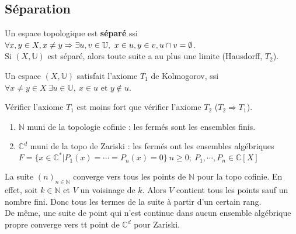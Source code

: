 \subsection{Séparation}
\begin{definition}
    Un espace topologique est \textbf{séparé} ssi $\forall x,y\in X,\\ x\neq y\Rightarrow \exists u,v\in \mathbb{U},\ x\in u, y\in v, u\cap v=\emptyset $.\\
Si $(X,\mathbb{U})$ est séparé, alors toute suite a au plus une limite (Hausdorff, $T_2$).\\

\end{definition}
\begin{definition}
        Un espace $(X,\mathbb{U})$ satisfait l'axiome $T_1$ de Kolmogorov, ssi $\forall x\neq y\in X\ \exists u\in \mathbb{U},\ x\in u \text{ et } y \not \in u$.\\

\end{definition}
\begin{ex}

Vérifier l'axiome $T_1$ est moins fort que vérifier l'axiome $T_2$ ($T_2 \Rightarrow T_1$). 
 
\begin{enumerate}

   \item $\mathbb{N} $ muni de la topologie cofinie : les fermés sont les ensembles finis.
\item $\mathbb{C}^d$ muni de la topo de Zariski : les fermés ont les ensembles algébriques $F=\{x\in \mathbb{C}^*|P_1(x)=\cdots = P_n(x)=0\}\ n\ge 0;\ P_1,\cdots,P_n\in \mathbb{C}[X]$
\end{enumerate}
\end{ex}
\begin{ex}

La suite $(n)_{n\in \mathbb{N} }$ converge vers tous les points de $\mathbb{N} $ pour la topo cofinie. En effet, soit $k\in \mathbb{N} $ et $V$ un voisinage de $k$. Alors $V$ contient tous les points sauf un nombre fini. Donc tous les termes de la suite à partir d'un certain rang.\\
De même, une suite de point qui n'est continue dans aucun ensemble algébrique propre converge vers tt point de $\mathbb{C}^d$ pour Zariski.
\end{ex}

